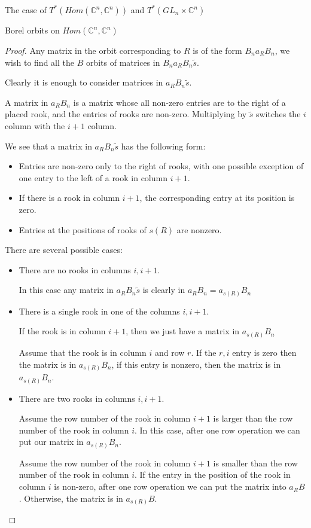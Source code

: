 \documentclass[12pt]{article}
\newcommand{\C}{\mathbb{C}}
\theoremstyle{plain}
\theoremstyle{definition}
\begin{document}
\begin{subsection}{The case of $T^*(Hom(\C^n,\C^n))$ and $T^*(GL_n\times \C^n)$}
\begin{subsubsection}{Borel orbits on $Hom(\C^n,\C^n)$}
\begin{proof}
        Any matrix in the orbit corresponding to $R$ is of the form $B_na_{R}B_n$, we wish to find all the $B$ orbits of matrices in $B_na_{R}B_n \tilde{s}$. 

        Clearly it is enough to consider matrices in $a_{R}B_n\tilde{s}$.

        A matrix in $a_{R}B_n$ is a matrix whose all non-zero entries are to the right of a placed rook, and the entries of rooks are non-zero. Multiplying by $\tilde{s}$ switches the $i$ column with the $i+1$ column.

        We see that a matrix in $a_{R}B_n\tilde{s}$ has the following form:
        \begin{itemize}
            \item Entries are non-zero only to the right of rooks, with one possible exception of one entry to the left of a rook in column $i+1$.
            \item If there is a rook in column $i+1$, the corresponding entry at its position is zero.
            \item Entries at the positions of rooks of $s(R)$ are nonzero.
        \end{itemize}
        
        There are several possible cases:

        \begin{itemize}
            \item There are no rooks in columns $i,i+1$. 

            In this case any matrix in $a_{R}B_n\tilde{s}$ is clearly in $a_{R}B_n=a_{s(R)}B_n$

            \item There is a single rook in one of the columns $i,i+1$.

            If the rook is in column $i+1$, then we just have a matrix in $a_{s(R)}B_n$

            Assume that the rook is in column $i$ and row $r$. If the $r,i$ entry is zero then the matrix is in $a_{s(R)}B_n$, if this entry is nonzero, then the matrix is in $a_{s(R)}B_n$.

            \item There are two rooks in columns $i,i+1$.


            Assume the row number of the rook in column $i+1$ is larger than the row number of the rook in column $i$. In this case, after one row operation we can put our matrix in $a_{s(R)}B_n$.

            Assume the row number of the rook in column $i+1$ is smaller than the row number of the rook in column $i$. If the entry in the position of the rook in column $i$ is non-zero, after one row operation we can put the matrix into $a_{R}B$. Otherwise, the matrix is in $a_{s(R)}B$.
            

\end{itemize}
\end{proof}
\end{subsubsection}
\end{subsection}
\end{document}

